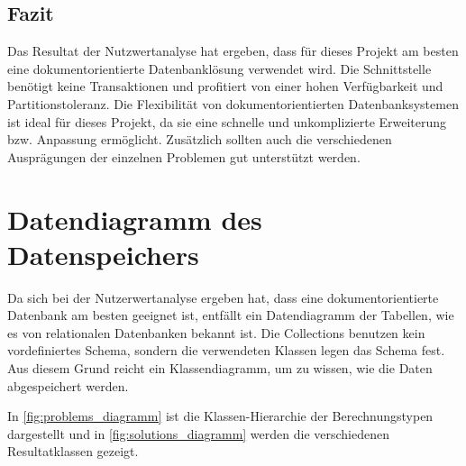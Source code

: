 \FloatBarrier
\subsection{Fazit}\label{architektur_fazit}
Das Resultat der Nutzwertanalyse hat ergeben, dass für dieses Projekt am besten eine dokumentorientierte Datenbanklösung verwendet wird.
Die Schnittstelle benötigt keine Transaktionen und profitiert von einer hohen Verfügbarkeit und Partitionstoleranz. Die Flexibilität
von dokumentorientierten Datenbanksystemen ist ideal für dieses Projekt, da sie eine schnelle und unkomplizierte Erweiterung bzw. Anpassung ermöglicht. Zusätzlich sollten 
auch die verschiedenen Ausprägungen der einzelnen Problemen gut unterstützt werden.

\newpage

\section{Datendiagramm des Datenspeichers}\label{datendiagramm_datenspeicher}
Da sich bei der Nutzerwertanalyse ergeben hat, dass eine dokumentorientierte Datenbank am besten geeignet ist, entfällt ein Datendiagramm der Tabellen, wie es von relationalen Datenbanken 
bekannt ist. Die Collections benutzen kein vordefiniertes Schema, sondern die verwendeten Klassen legen das Schema fest. Aus diesem Grund reicht ein Klassendiagramm, um zu wissen, wie 
die Daten abgespeichert werden.

In \autoref{fig:problems_diagramm} ist die Klassen-Hierarchie der Berechnungstypen dargestellt und in \autoref{fig:solutions_diagramm} werden die verschiedenen 
Resultatklassen gezeigt.

